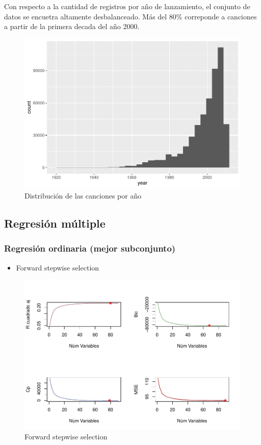 \documentclass[conference,final,]{IEEEtran}
\providecommand{\tightlist}{%
  \setlength{\itemsep}{0pt}\setlength{\parskip}{0pt}}
\begin{document}
Con respecto a la cantidad de registros por año de lanzamiento, el
conjunto de datos se encuetra altamente desbalanceado. Más del 80\%
correponde a canciones a partir de la primera decada del año 2000.

\begin{figure}[ht]

{\centering \includegraphics[width=0.6\linewidth]{YearPrediction_Reporte_files/figure-latex/unnamed-chunk-1-1} 

}

\caption{Distribución de las canciones por año}\label{fig:unnamed-chunk-1}
\end{figure}

\hypertarget{regresion-multiple}{%
\subsection{Regresión múltiple}\label{regresion-multiple}}

\hypertarget{regresion-ordinaria-mejor-subconjunto}{%
\subsubsection{Regresión ordinaria (mejor
subconjunto)}\label{regresion-ordinaria-mejor-subconjunto}}

\begin{itemize}
\tightlist
\item
  Forward stepwise selection
\end{itemize}

\begin{figure}[ht]

{\centering \includegraphics[width=0.6\linewidth]{YearPrediction_Reporte_files/figure-latex/unnamed-chunk-5-1} 

}

\caption{Forward stepwise selection}\label{fig:unnamed-chunk-5}
\end{figure}
\end{document}
